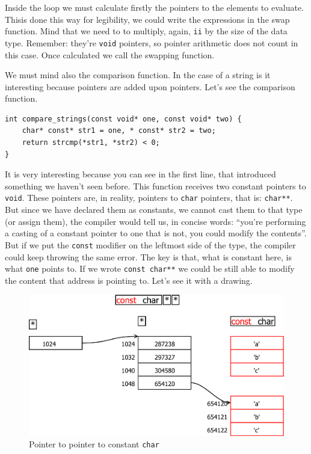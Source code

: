 \documentclass[a4paper]{article}
\begin{document}
Inside the loop we must calculate firstly the pointers to the elements to
evaluate. Thisis done this way for legibility, we could write the expressions
in the swap function. Mind that we need to to multiply, again, \verb!ii! by the
size of the data type. Remember: they're \verb"void" pointers, so pointer
arithmetic does not count in this case. Once calculated we call the swapping
function.

We must mind also the comparison function. In the case of a string is it
interesting because pointers are added upon pointers. Let's see the comparison
function.

\noindent
\begin{minipage}[H]{\linewidth}
\mbox{}
\begin{lstlisting}[style=C,
caption={Función auxiliar de comparación de \textit{strings}},
label={lst:strcompare}]
int compare_strings(const void* one, const void* two) {
    char* const* str1 = one, * const* str2 = two;
    return strcmp(*str1, *str2) < 0;
}
\end{lstlisting}
\end{minipage}

It is very interesting because you can see in the first line, that introduced
something we haven't seen before. This function receives two constant pointers
to \verb!void!. These pointers are, in reality, pointers to \verb!char!
pointers, that is: \verb!char**!. But since we have declared them as constants,
we cannot cast them to that type (or assign them), the compiler would tell us,
in concise words: ``you're performing a casting of a constant pointer to one
that is not, you could modify the contents''. But if we put the \verb!const!
modifier on the leftmost side of the type, the compiler could keep throwing
the same error. The key is that, what is constant here, is what \verb!one!
points to. If we wrote \verb!const char**! we could be still able to modify
the content that address is pointing to. Let's see it with a drawing.

\begin{figure}[H]
    \includegraphics[width=\linewidth]{const_char_pointer_pointer}
    \caption{Pointer to pointer to constant \texttt{char}}
    \label{img:constcharpointerpointer}
\end{figure}
\end{document}
